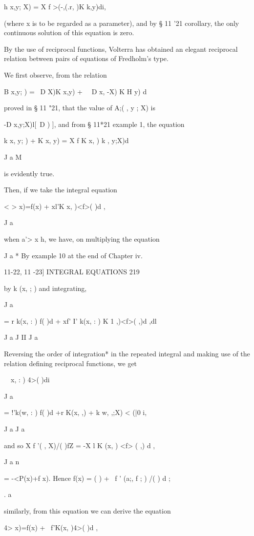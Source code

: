 h x,y; X) = X f >(-,(.r, )K k,y)di,

(where x is to be regarded as a parameter), and by § 11 '21 corollary,
the only continuous solution of this equation is zero.

By the use of reciprocal functions, Volterra has obtained an elegant
reciprocal relation between pairs of equations of Fredholm's type.

We first observe, from the relation

B x,y; ) = \ D X)K x,y) + \ \ D x, -X) K H y) d

proved in § 11 "21, that the value of A;( , y ; X) is

-D x,y;X)l[\ D ) ], and from § 11*21 example 1, the equation

k x, y; ) + K x, y) = X f K x, ) k , y;X)d

J a M

is evidently true.

Then, if we take the integral equation

< > x)=f(x) + xl'K x, )<f>( )d ,

J a

when a'> x h, we have, on multiplying the equation

J a * By example 10 at the end of Chapter iv.



11-22, 11 -23] INTEGRAL EQUATIONS 219

by k (x, ; ) and integrating,

J a

= r k(x, : ) f( )d + xf' I' k(x, : ) K 1 ,)<f>( ,)d ,dl

J a J II J a

Reversing the order of integration* in the repeated integral and
making use of the relation defining reciprocal functions, we get

\ \ x, : ) 4>( )di

J a

= !'k(w, : ) f( )d +r K(x, ,) + k w, ,;X) < (|0 i,

J a J a

and so X f '( , X)/( )fZ = -X l K (x, ) <f> ( ,) d ,

J a n

= -<P(x)+f x). Hence f(x) = ( ) + \ f ' (a;, f ; ) /( ) d ;

. a

similarly, from this equation we can derive the equation

4> x)=f(x) + \ f'K(x, )4>( )d ,

